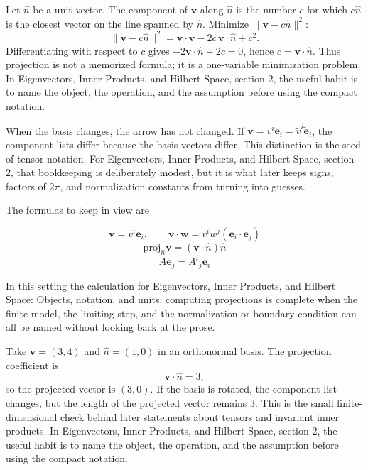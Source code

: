 Let \(\hat n\) be a unit vector.  The component of \(\bm v\) along \(\hat n\) is the number \(c\) for which \(c\hat n\) is the closest vector on the line spanned by \(\hat n\).  Minimize \(\|\bm v-c\hat n\|^2\):
\[
  \|\bm v-c\hat n\|^2=\bm v\cdot\bm v-2c\,\bm v\cdot\hat n+c^2.
\]
Differentiating with respect to \(c\) gives \(-2\bm v\cdot\hat n+2c=0\), hence \(c=\bm v\cdot\hat n\).  Thus projection is not a memorized formula; it is a one-variable minimization problem.  In Eigenvectors, Inner Products, and Hilbert Space, section 2, the useful habit is to name the object, the operation, and the assumption before using the compact notation.

When the basis changes, the arrow has not changed.  If \(\bm v=v^i\bm e_i=\tilde v^i\tilde{\bm e}_i\), the component lists differ because the basis vectors differ.  This distinction is the seed of tensor notation.  For Eigenvectors, Inner Products, and Hilbert Space, section 2, that bookkeeping is deliberately modest, but it is what later keeps signs, factors of \(2\pi\), and normalization constants from turning into guesses.

The formulas to keep in view are

\[
  \bm v=v^i\bm e_i,\qquad \bm v\cdot\bm w=v^iw^j(\bm e_i\cdot\bm e_j)
\]
\[
  \mathrm{proj}_{\hat n}\bm v=(\bm v\cdot\hat n)\hat n
\]
\[
  A\bm e_j=A^i{}_j\bm e_i
\]

In this setting the calculation for Eigenvectors, Inner Products, and Hilbert Space: Objects, notation, and units: computing projections is complete when the finite model, the limiting step, and the normalization or boundary condition can all be named without looking back at the prose.




\begin{example}
Take \(\bm v=(3,4)\) and \(\hat n=(1,0)\) in an orthonormal basis.  The projection coefficient is
\[
  \bm v\cdot\hat n=3,
\]
so the projected vector is \((3,0)\).  If the basis is rotated, the component list changes, but the length of the projected vector remains \(3\).  This is the small finite-dimensional check behind later statements about tensors and invariant inner products.  In Eigenvectors, Inner Products, and Hilbert Space, section 2, the useful habit is to name the object, the operation, and the assumption before using the compact notation.
\end{example}



